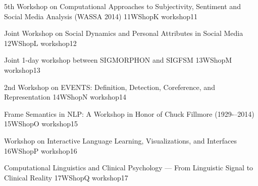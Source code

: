 \begin{wsschedule}
  {5th Workshop on Computational Approaches to Subjectivity, Sentiment and Social Media Analysis (WASSA 2014)}
  {11}{WShopK}
  {workshop11}
  {\WShopLocK}
  
\end{wsschedule}
\begin{wsschedule}
  {Joint Workshop on Social Dynamics and Personal Attributes in Social Media}
  {12}{WShopL}
  {workshop12}
  {\WShopLocL}
  
\end{wsschedule}
\begin{wsschedule}
  {Joint 1-day workshop between SIGMORPHON and SIGFSM}
  {13}{WShopM}
  {workshop13}
  {\WShopLocM}
  
\end{wsschedule}
\begin{wsschedule}
  {2nd Workshop on EVENTS: Definition, Detection, Coreference, and Representation}
  {14}{WShopN}
  {workshop14}
  {\WShopLocN}
  
\end{wsschedule}
\begin{wsschedule}
  {Frame Semantics in NLP: A Workshop in Honor of Chuck Fillmore (1929-–2014)}
  {15}{WShopO}
  {workshop15}
  {\WShopLocO}
  
\end{wsschedule}
\begin{wsschedule}
  {Workshop on Interactive Language Learning, Visualizations, and Interfaces}
  {16}{WShopP}
  {workshop16}
  {\WShopLocP}
  
\end{wsschedule}
\begin{wsschedule}
  {Computational Linguistics and Clinical Psychology --- From Linguistic Signal to Clinical Reality}
  {17}{WShopQ}
  {workshop17}
  {\WShopLocQ}
  
\end{wsschedule}

\clearpage{\thispagestyle{emptyheader}\cleardoublepage}
